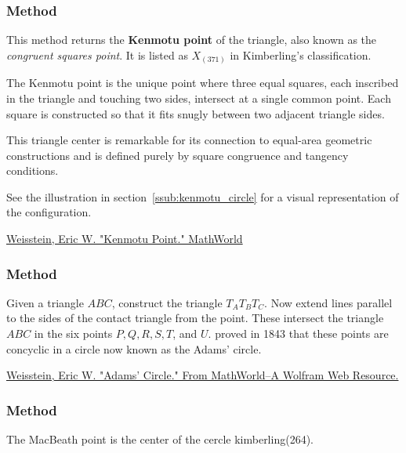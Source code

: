 \subsubsection{Method }
\label{ssub:_triangle_kenmotu__point}

This method returns the \textbf{Kenmotu point} of the triangle, also known as the \emph{congruent squares point}. It is listed as $X_{(371)}$ in Kimberling’s classification.

\medskip

The Kenmotu point is the unique point where three equal squares, each inscribed in the triangle and touching two sides, intersect at a single common point. Each square is constructed so that it fits snugly between two adjacent triangle sides.

\medskip

This triangle center is remarkable for its connection to equal-area geometric constructions and is defined purely by square congruence and tangency conditions.

\medskip

See  the illustration in section~\ref{ssub:kenmotu_circle} for a visual representation of the configuration.
\begin{flushright}
\small
\href{https://mathworld.wolfram.com/KenmotuPoint.html}{Weisstein, Eric W. "Kenmotu Point." MathWorld}
\end{flushright}

\subsubsection{Method }
\label{ssub:method_triangle_adams_points}
Given a triangle $ABC$, construct the  triangle $T_AT_BT_C$. Now extend lines parallel to the sides of the contact triangle from the  point. These intersect the triangle $ABC$ in the six points $P, Q,  R, S, T$, and $U$.  proved in 1843 that these points are concyclic in a circle now known as the Adams' circle.
\begin{flushright}
\small
\href{ https://mathworld.wolfram.com/AdamsCircle.html}{Weisstein, Eric W. "Adams' Circle." From MathWorld--A Wolfram Web Resource.}
\end{flushright}

\subsubsection{Method }
\label{ssub:method_triangle_macbeath_point}
The MacBeath point is the center of the cercle kimberling(264).

